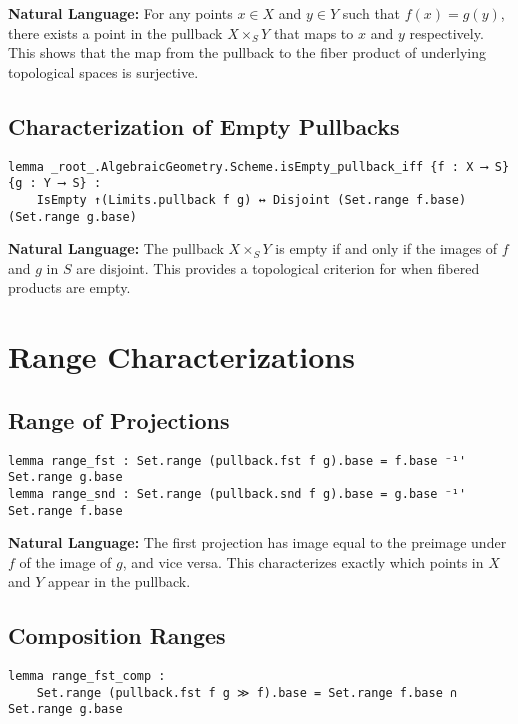 \documentclass{article}
\theoremstyle{definition}
\begin{document}
\textbf{Natural Language:} For any points $x \in X$ and $y \in Y$ such that $f(x) = g(y)$, there exists a point in the pullback $X \times_S Y$ that maps to $x$ and $y$ respectively. This shows that the map from the pullback to the fiber product of underlying topological spaces is surjective.

\subsection{Characterization of Empty Pullbacks}

\begin{lstlisting}
lemma _root_.AlgebraicGeometry.Scheme.isEmpty_pullback_iff {f : X ⟶ S} {g : Y ⟶ S} :
    IsEmpty ↑(Limits.pullback f g) ↔ Disjoint (Set.range f.base) (Set.range g.base)
\end{lstlisting}

\textbf{Natural Language:} The pullback $X \times_S Y$ is empty if and only if the images of $f$ and $g$ in $S$ are disjoint. This provides a topological criterion for when fibered products are empty.

\section{Range Characterizations}

\subsection{Range of Projections}

\begin{lstlisting}
lemma range_fst : Set.range (pullback.fst f g).base = f.base ⁻¹' Set.range g.base
lemma range_snd : Set.range (pullback.snd f g).base = g.base ⁻¹' Set.range f.base
\end{lstlisting}

\textbf{Natural Language:} The first projection has image equal to the preimage under $f$ of the image of $g$, and vice versa. This characterizes exactly which points in $X$ and $Y$ appear in the pullback.

\subsection{Composition Ranges}

\begin{lstlisting}
lemma range_fst_comp :
    Set.range (pullback.fst f g ≫ f).base = Set.range f.base ∩ Set.range g.base
\end{lstlisting}
\end{document}
